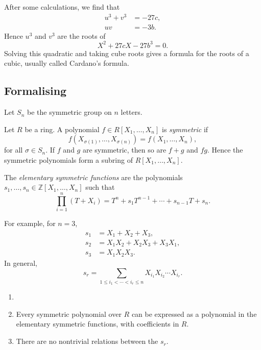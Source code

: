 \documentclass[12pt]{article}
\begin{document}
After some calculations, we find that
\begin{align*}
	u^3 + v^3 &= -27c,\\
	uv &= -3b.
\end{align*}
Hence $u^3$ and $v^3$ are the roots of
\[
X^2 + 27cX - 27b^3 = 0.
\]
Solving this quadratic and taking cube roots gives a formula for the roots of a cubic, usually called Cardano's formula.

\subsection{Formalising}
\label{sub:sym_form}

Let $S_n$ be the symmetric group on $n$ letters.
\begin{definition}
	Let $R$ be a ring. A polynomial $f \in R[X_1, \ldots, X_n]$ is \emph{symmetric} if
	\[
	f(X_{\sigma(1)}, \ldots, X_{\sigma(n)}) = f(X_1, \ldots, X_n),
	\]
	for all $\sigma \in S_n$. If $f$ and $g$ are symmetric, then so are $f+g$ and $fg$. Hence the symmetric polynomials form a subring of $R[X_1, \ldots, X_n]$.
\end{definition}

\begin{definition}
	The \emph{elementary symmetric functions} are the polynomials $s_1, \ldots, s_n \in \mathbb{Z}[X_1, \ldots, X_n]$ such that
	\[
	\prod_{i = 1}^{n} (T+X_i) = T^{n} + s_1 T^{n-1} + \cdots + s_{n-1} T + s_n.
	\]
\end{definition}

For example, for $n = 3$,
\begin{align*}
	s_1 &= X_1+X_2+X_3,\\
	s_2 &= X_1X_2+X_2X_3+X_3X_1,\\
	s_3 &= X_1X_2X_3.
\end{align*}
In general,
\[
s_r = \sum_{1\leq i_1<\cdots<i_r\leq n} X_{i_1}X_{i_2}\cdots X_{i_r}.
\]
\begin{theorem}
	\begin{enumerate}[\normalfont(i)]
		\item[]
		\item Every symmetric polynomial over $R$ can be expressed as a polynomial in the elementary symmetric functions, with coefficients in $R$.
		\item There are no nontrivial relations between the $s_r$.
	\end{enumerate}
\end{theorem}
\end{document}
